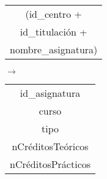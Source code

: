  \begin{center}
    \begin{minipage}{4.2cm}{\begin{tabular}{ | c | }
                  \hline
                  (id\_centro + \\
                  id\_titulación + \\
                  nombre\_asignatura) \\
                  \hline
                 \end{tabular} }
    \end{minipage}
    \begin{minipage}{0.7cm}{$\longrightarrow$}
    \end{minipage}
    \begin{minipage}{5.9cm}{\begin{tabular}{ | c | }
                  \hline
                  id\_asignatura \\
                  curso \\
                  tipo \\
                  nCréditosTeóricos \\
                  nCréditosPrácticos \\
                  \hline
                 \end{tabular} }
    \end{minipage}
  \end{center}
